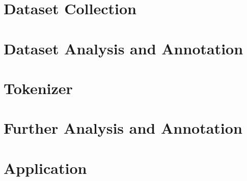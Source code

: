 \section{Dataset Collection}

\section{Dataset Analysis and Annotation}

\section{Tokenizer}

\section{Further Analysis and Annotation}

\section{Application}